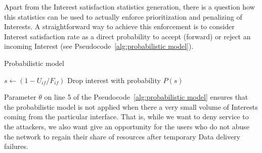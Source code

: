 
Apart from the Interest satisfaction statistics generation, there is a question how this statistics can be used to actually enforce prioritization and penalizing of Interests.
A straightforward way to achieve this enforcement is to consider Interest satisfaction rate as a direct probability to accept (forward) or reject an incoming Interest (see Pseudocode~\ref{alg:probabilistic model}).



\begin{algorithm}[h]
\caption{Probabilistic model}
\label{alg:probabilistic model}
\begin{algorithmic}[1]
\State{} 

\vspace{0.2cm}

    \State{} 
    \State{} 
    
     
        \State $s \leftarrow (1 - U_{if} / F_{if})$
        \State Drop interest with probability $P(s)$
    \EndIf

\EndFunction

\end{algorithmic}
\end{algorithm}

Parameter $\theta$ on line 5 of the Pseudocode~\ref{alg:probabilistic model} ensures that the probabilistic model is not applied when there a very small volume of Interests coming from the particular interface.
That is, while we want to deny service to the attackers, we also want give an opportunity for the users who do not abuse the network to regain their share of resources after temporary Data delivery failures.

